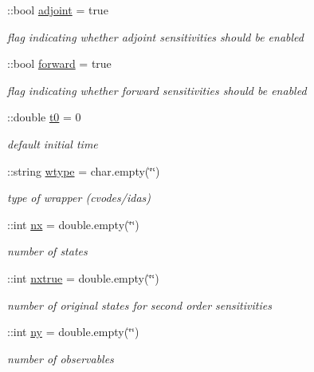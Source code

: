 \begin{DoxyCompactItemize}
\+::bool \mbox{\hyperlink{classamimodel_ab6d500b41cf50693452415caca31d32e}{adjoint}} = true
\begin{DoxyCompactList}\small\item\em flag indicating whether adjoint sensitivities should be enabled \end{DoxyCompactList}\item 
\+::bool \mbox{\hyperlink{classamimodel_a81e42e48c9c72814166c8f7cd414ce24}{forward}} = true
\begin{DoxyCompactList}\small\item\em flag indicating whether forward sensitivities should be enabled \end{DoxyCompactList}\item 
\+::double \mbox{\hyperlink{classamimodel_abdb5a42ffee3ca622484b53a322f1004}{t0}} = 0
\begin{DoxyCompactList}\small\item\em default initial time \end{DoxyCompactList}\item 
\+::string \mbox{\hyperlink{classamimodel_a5376250224ce32fb558d88aa0b5a93ff}{wtype}} = char.\+empty(\char`\"{}\char`\"{})
\begin{DoxyCompactList}\small\item\em type of wrapper (cvodes/idas) \end{DoxyCompactList}\item 
\+::int \mbox{\hyperlink{classamimodel_a84e4236f07668a770c27567f1f9615ff}{nx}} = double.\+empty(\char`\"{}\char`\"{})
\begin{DoxyCompactList}\small\item\em number of states \end{DoxyCompactList}\item 
\+::int \mbox{\hyperlink{classamimodel_a49c476de14a021114feb8c95da04952a}{nxtrue}} = double.\+empty(\char`\"{}\char`\"{})
\begin{DoxyCompactList}\small\item\em number of original states for second order sensitivities \end{DoxyCompactList}\item 
\+::int \mbox{\hyperlink{classamimodel_a289ca425eb368f1d582b6be2be0d3dfc}{ny}} = double.\+empty(\char`\"{}\char`\"{})
\begin{DoxyCompactList}\small\item\em number of observables \end{DoxyCompactList}\item 

\end{DoxyCompactItemize}
